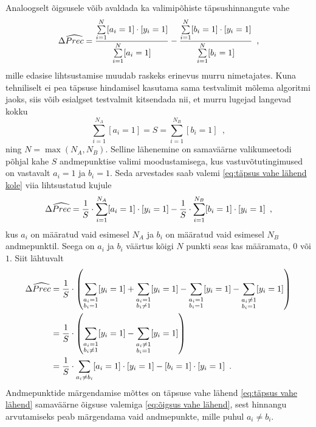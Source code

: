 Analoogselt õigsusele võib avaldada ka valimipõhiste täpsushinnangute vahe
\begin{equation}
    \label{eq:täpsus vahe lähend kole}
    \Delta\widehat{Prec}=\frac{\sum\limits_{i=1}^{N}[a_i=1]\cdot[y_i=1]}{\sum\limits_{i=1}^N[a_i=1]}-
    \frac{\sum\limits_{i=1}^{N}[b_i=1]\cdot[y_i=1]}{\sum\limits_{i=1}^N [b_i=1]} \enspace,
\end{equation}
mille edasise lihtsustamise muudab raskeks erinevus murru nimetajates. Kuna tehniliselt ei pea täpsuse hindamisel kasutama sama testvalimit mõlema algoritmi jaoks, siis võib esialgset testvalmit kitsendada nii, et murru lugejad langevad kokku
\begin{equation*}
    \sum\limits_{i=1}^{N_A}[a_i=1]=S=\sum\limits_{i=1}^{N_B}[b_i=1] \enspace,
\end{equation*}
ning $N=\max(N_A, N_B)$.
Selline lähenemine on samaväärne valikumeetodi põhjal kahe $S$ andmepunktise valimi moodustamisega, kus vastuvõtutingimused on vastavalt $a_i=1$ ja $b_i=1$. Seda arvestades saab valemi \eqref{eq:täpsus vahe lähend kole} viia lihtsustatud kujule
\begin{equation}
     \Delta\widehat{Prec}=\frac{1}{S}\cdot\sum\limits_{i=1}^{N_A}[a_i=1]\cdot[y_i=1]-\frac{1}{S}\cdot\sum\limits_{i=1}^{N_B}[b_i=1]\cdot[y_i=1] \enspace,
\end{equation}
kus $a_i$ on määratud vaid esimesel $N_A$ ja $b_i$ on määratud vaid esimesel $N_B$ andmepunktil. Seega on $a_i$ ja $b_i$ väärtus kõigi $N$ punkti seas kas määramata, $0$ või $1$. Siit lähtuvalt
\begin{align}
    \Delta\widehat{Prec}&=\frac{1}{S}\cdot\left(\sum_{\substack{a_i=1\\ b_i=1}}[y_i=1]+\sum_{\substack{a_i=1\\ b_i\neq 1}}[y_i=1]-\sum_{\substack{a_i=1\\ b_i=1}}[y_i=1]-\sum_{\substack{a_i\neq 1\\ b_i=1}}[y_i=1]\right) \nonumber\\
    &=\frac{1}{S}\cdot\left(\sum_{\substack{a_i=1\\ b_i\neq 1}}[y_i=1]-\sum_{\substack{a_i\neq 1\\ b_i=1}}[y_i=1]\right) \nonumber\\
    &=\frac{1}{S}\cdot\sum_{a_i\neq b_i}[a_i=1]\cdot[y_i=1]-[b_i=1]\cdot[y_i=1] \enspace. \label{eq:täpsus vahe lähend}
\end{align}
Andmepunktide märgendamise mõttes on täpsuse vahe lähend \eqref{eq:täpsus vahe lähend} samaväärne õigsuse valemiga \eqref{eq:õigsus vahe lähend}, sest hinnangu arvutamiseks peab märgendama vaid andmepunkte, mille puhul $a_i\neq b_i$.

